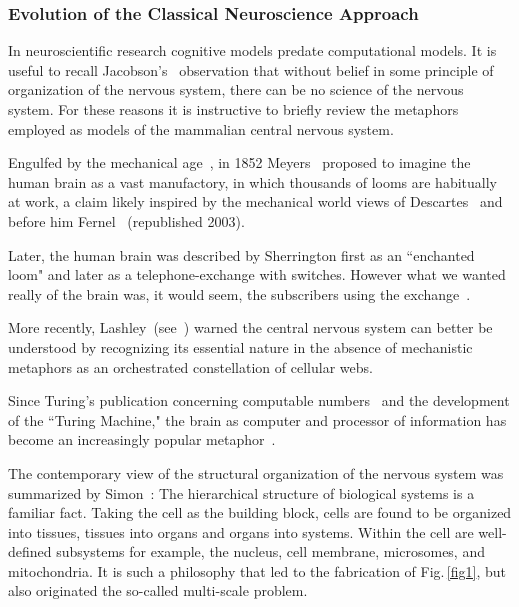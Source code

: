 \documentclass[10pt,letterpaper]{article}
\begin{document}
\subsubsection*{Evolution of the Classical Neuroscience Approach}

In neuroscientific research cognitive models predate computational models.
It is useful to recall Jacobson's~\cite{jacobson93} observation that without belief in some principle of organization of the nervous system, there can be no science of the nervous system.
For these reasons it is instructive to briefly review the metaphors employed as models of the mammalian central nervous system. 

Engulfed by the mechanical age~\cite{carlyle52}, in 1852 Meyers~\cite{meyers87} proposed to imagine the human brain as a vast manufactory, in which thousands of looms are habitually at work, a claim likely inspired by the mechanical world views of Descartes~\cite{descartes62} and before him Fernel~\cite{fernel67} (republished 2003).

Later, the human brain was described by Sherrington first as an ``enchanted loom" and later as a telephone-exchange with switches.  However what we wanted really of the brain was, it would seem, the subscribers using the exchange~\cite{sherrington53}.

More recently, Lashley~(see~\cite{jorgensen21}) warned the central nervous system can better be understood by recognizing its essential nature in the absence of mechanistic metaphors as an orchestrated constellation of cellular webs.

Since Turing's publication concerning computable numbers~\cite{turing38} and the development of the ``Turing Machine," the brain as computer and processor of information has become an increasingly popular metaphor~\cite{matassi23}.

The contemporary view of the structural organization of the nervous system was summarized by Simon~\cite{simon96a}: The hierarchical structure of biological systems is a familiar fact. Taking the cell as the building block, cells are found to be organized into tissues, tissues into organs and organs into systems. Within the cell are well-defined subsystems for example, the nucleus, cell membrane, microsomes, and mitochondria. It is such a philosophy that led to the fabrication of Fig.\,\ref{fig1}, but also originated the so-called multi-scale problem.
\end{document}
